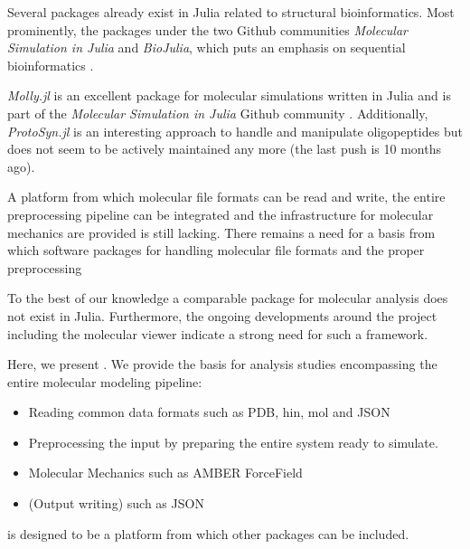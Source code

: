 Several packages already exist in Julia related to structural bioinformatics. Most prominently, the packages under the two Github communities \textit{Molecular Simulation in Julia} and \textit{BioJulia}, which puts an emphasis on sequential bioinformatics \cite{JuliaMolSim, BioJulia}. 

\textit{Molly.jl} is an excellent package for molecular simulations written in Julia and is part of the \textit{Molecular Simulation in Julia} Github community \cite{Greener2024}. 
Additionally, \textit{ProtoSyn.jl} is an interesting approach to handle and manipulate oligopeptides but does not seem to be actively maintained any more (the last push is 10 months ago).

A platform from which molecular file formats can be read and write, the entire preprocessing pipeline can be integrated and the infrastructure for molecular mechanics are provided is still lacking. 
There remains a need for a basis from which software packages for handling molecular file formats and the proper preprocessing


To the best of our knowledge a comparable package for molecular analysis does not exist in Julia. Furthermore, the ongoing developments around the \ball project including the molecular viewer indicate a strong need for such a framework. 


Here, we present \biochem. We provide the basis for analysis studies encompassing the entire molecular modeling pipeline:
\begin{itemize}
	\item Reading common data formats such as PDB, hin, mol and JSON
	\item Preprocessing the input by preparing the entire system ready to simulate.
	\item Molecular Mechanics such as AMBER ForceField
	\item (Output writing) such as JSON
\end{itemize}

\biochem is designed to be a platform from which other packages can be included.

